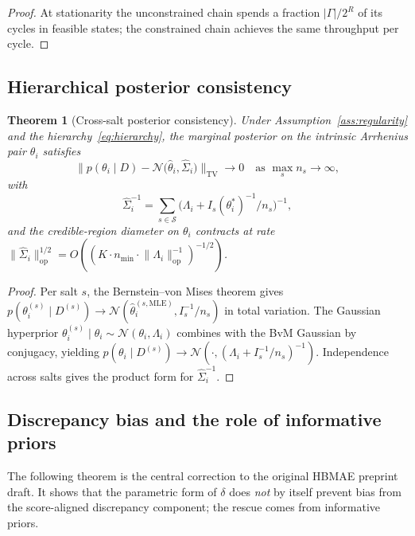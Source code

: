 \documentclass[11pt]{article}
\newtheorem{theorem}{Theorem}
\theoremstyle{definition}
\theoremstyle{remark}
\newcommand{\norm}[1]{\lVert #1 \rVert}
\newcommand{\TV}{\mathrm{TV}}
\newcommand{\HBMAE}{HBMAE\xspace}
\begin{document}
\begin{proof}
At stationarity the unconstrained chain spends a fraction $|\Gamma|/2^R$ of its cycles in
feasible states; the constrained chain achieves the same throughput per cycle.
\end{proof}

\subsection{Hierarchical posterior consistency}

\begin{theorem}[Cross-salt posterior consistency]\label{thm:bvm}
Under Assumption~\ref{ass:regularity} and the hierarchy~\eqref{eq:hierarchy}, the marginal
posterior on the intrinsic Arrhenius pair $\theta_i$ satisfies
\[
  \norm{p(\theta_i\mid D)-\mathcal N\bigl(\hat\theta_i,\hat\Sigma_i\bigr)}_{\TV}\to 0
  \quad\text{as }\max_s n_s\to\infty,
\]
with
\[
  \hat\Sigma_i^{-1}=\sum_{s\in\mathcal S}\bigl(\Lambda_i+I_s(\theta_i^*)^{-1}/n_s\bigr)^{-1},
\]
and the credible-region diameter on $\theta_i$ contracts at rate
$\norm{\hat\Sigma_i}_{\mathrm{op}}^{1/2}=O((K\cdot n_{\min}\cdot\norm{\Lambda_i}_{\mathrm{op}}^{-1})^{-1/2})$.
\end{theorem}

\begin{proof}
Per salt $s$, the Bernstein--von Mises theorem \citep[Thm.~10.1]{vdVaart1998} gives
$p(\theta_i^{(s)}\mid D^{(s)})\to\mathcal N(\hat\theta_i^{(s,\mathrm{MLE})},I_s^{-1}/n_s)$ in
total variation. The Gaussian hyperprior $\theta_i^{(s)}\mid\theta_i\sim\mathcal N(\theta_i,\Lambda_i)$
combines with the BvM Gaussian by conjugacy, yielding $p(\theta_i\mid D^{(s)})\to\mathcal N(\cdot,(\Lambda_i+I_s^{-1}/n_s)^{-1})$.
Independence across salts gives the product form for $\hat\Sigma_i^{-1}$.
\end{proof}

\subsection{Discrepancy bias and the role of informative priors}\label{sec:bias}

The following theorem is the central correction to the original \HBMAE preprint draft.
It shows that the parametric form of $\delta$ does \emph{not} by itself prevent bias from
the score-aligned discrepancy component; the rescue comes from informative priors.
\end{document}
